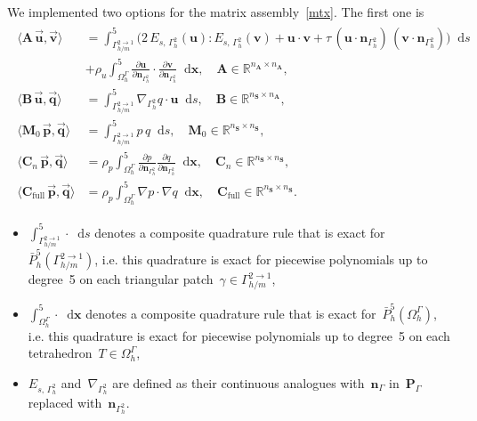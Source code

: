 \documentclass[12pt]{article}
\newcommand{\vect}[1]{\boldsymbol{\mathbf{#1}}}
\newcommand*\diff{\mathop{}\!\mathrm{d}}
\begin{document}
We implemented two options for the matrix assembly~\eqref{mtx}. The first one is
\begin{align}\begin{split}\label{mtx_exact}
	\langle \vect A\,\vec{\vect u}, \vec{\vect v} \rangle &= 
		\int^5_{\Gamma_{h/m}^{2 \to 1}} \big( 2\,E_{s,\,\Gamma_{h}^2}(\vect u) : E_{s,\,\Gamma_{h}^2}(\vect v) + \vect u\cdot\vect v + \tau\,(\vect u\cdot\vect n_{\Gamma_{h}^2})\,(\vect v\cdot\vect n_{\Gamma_{h}^2}) \big) \diff{s} \\
	&
		+ \rho_u \int^5_{\Omega_h^{\Gamma}} \frac{\partial \vect u}{\partial\vect n_{\Gamma_{h}^2}}\cdot\frac{\partial \vect v}{\partial\vect n_{\Gamma_{h}^2}} \diff{\vect x}, \quad \vect A \in \mathbb R^{n_{\vect A} \times n_{\vect A}},\\
	\langle \vect B\,\vec{\vect u}, \vec{\vect q} \rangle &= 
		\int^5_{\Gamma_{h/m}^{2 \to 1}} \nabla_{\Gamma_h^2} q \cdot \vect u \diff{s}, \quad \vect B \in \mathbb R^{n_{\vect S} \times n_{\vect A}},\\
	\langle \vect M_0\,\vec{\vect p}, \vec{\vect q} \rangle &=
		\int^5_{\Gamma_{h/m}^{2 \to 1}} p\,q \diff{s}, \quad \vect M_0 \in \mathbb R^{n_{\vect S} \times n_{\vect S}},\\
	\langle \vect C_n\,\vec{\vect p}, \vec{\vect q} \rangle &=
		\rho_p \int^5_{\Omega^{\Gamma}_h} \frac{\partial p}{\partial\vect n_{\Gamma_{h}^2}} \frac{\partial q}{\partial\vect n_{\Gamma_{h}^2}} \diff{\vect x}, \quad \vect C_n \in \mathbb R^{n_{\vect S} \times n_{\vect S}},\\
	\langle \vect C_{\text{full}}\,\vec{\vect p}, \vec{\vect q} \rangle &=
		\rho_p \int^5_{\Omega^{\Gamma}_h} \nabla p \cdot \nabla q \diff{\vect x}, \quad \vect C_{\text{full}} \in \mathbb R^{n_{\vect S} \times n_{\vect S}}.	 
\end{split}\end{align}
\begin{itemize}
	\item $\int^5_{\Gamma_{h/m}^{2 \to 1}} \cdot \diff{s}$ denotes a composite quadrature rule that is exact for~$\bar P_h^5(\Gamma_{h/m}^{2 \to 1})$, i.e. this quadrature is exact for piecewise polynomials up to degree~5 on each triangular patch~$\gamma \in \Gamma_{h/m}^{2 \to 1}$, 
	\item $\int^5_{\Omega^{\Gamma}_h} \cdot \diff{\vect x}$ denotes a composite quadrature rule that is exact for~$\bar P_h^5(\Omega^{\Gamma}_h)$, i.e. this quadrature is exact for piecewise polynomials up to degree~5 on each tetrahedron~$T \in \Omega^{\Gamma}_h$, 
	\item $E_{s,\,\Gamma_{h}^2}$ and~$\nabla_{\Gamma_h^2}$ are defined as their continuous analogues with~$\vect n_{\Gamma}$ in~$\vect P_\Gamma$ replaced with~$\vect n_{\Gamma_{h}^2}$.
\end{itemize}
\end{document}
